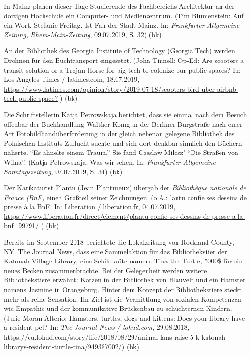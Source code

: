 \documentclass[a4paper,
fontsize=11pt,
oneside,
numbers=noperiodatend,
parskip=half-,
bibliography=totoc,
final
]{scrartcl}
\begin{document}
In Mainz planen dieser Tage Studierende des Fachbereichs Architektur an
der dortigen Hochschule ein Computer- und Medienzentrum. (Tim
Blumenstein: Auf ein Wort. Stefanie Freitag. Ist Fan der Stadt Mainz.
In: \emph{Frankfurter Allgemeine Zeitung, Rhein-Main-Zeitung},
09.07.2019, S. 32) (bk)

An der Bibliothek des Georgia Institute of Technology (Georgia Tech)
werden Drohnen für den Buchtransport eingesetzt. (John Tinnell: Op-Ed:
Are scooters a transit solution or a Trojan Horse for big tech to
colonize our public spaces? In: Los Angeles Times / latimes.com,
18.07.2019,
\url{https://www.latimes.com/opinion/story/2019-07-18/scooters-bird-uber-airbnb-tech-public-space?}
) (bk)

Die Schriftstellerin Katja Petrowskaja berichtet, dass sie einmal nach
dem Besuch offenbar der Buchhandlung Walther König in der Berliner
Burgstraße nach einer Art Fotobildbandüberforderung in der gleich
nebenan gelegene Bibliothek des Polnischen Instituts Zuflucht suchte und
sich dort denkbar sinnlich den Büchern näherte. \enquote{Es ähnelte
einem Traum.} Sie fand Czeslaw Milosz' \enquote{Die Straßen von Wilna}.
(Katja Petrowskaja: Was wir sehen. In: \emph{Frankfurter Allgemeine
Sonntagszeitung}, 07.07.2019, S. 34) (bk)

Der Karikaturist Plantu (Jean Plantureux) übergab der \emph{Bibliothèque
nationale de France (BnF)} einen Großteil seiner Zeichnungen. (o.A.:
lantu confie ses dessins de presse à la BnF. In: Liberation /
liberation.fr, 04.07.2019,
\url{https://www.liberation.fr/direct/element/plantu-confie-ses-dessins-de-presse-a-la-bnf_99791/}
) (bk)

Bereits im September 2018 berichtete die Lokalzeitung von Rockland
County, NY, The Journal News, dass eine Sammelaktion für das
Bibliothekstier der Katonah Village Library, eine Schildkröte namens
Tina the Turtle, 5000\$ für ein neues Becken zusammenbrachte. Bei der
Gelegenheit werden weitere Bibliothekstiere erwähnt: Katzen in der
Bibliothek von Blauvelt und ein Hamster namens Jasmine in Orangeburg.
Hinter dem Konzept der Bibliothekstiere steckt mehr als reine Sensation.
Ihr Ziel ist die Vermittlung von sozialen Kompetenzen wie Empathie und
der kommunikative Brückenbau zu schüchternen Kindern. (Julie Moran
Alterio: Hamsters, turtles, dogs and kittens: Does your library have a
resident pet? In: \emph{The Journal News / lohud.com}, 29.08.2018,
\url{https://eu.lohud.com/story/life/2018/08/29/animal-fans-raise-5-k-katonah-librarys-resident-turtle-tina/949387002/})
(bk)
\end{document}

